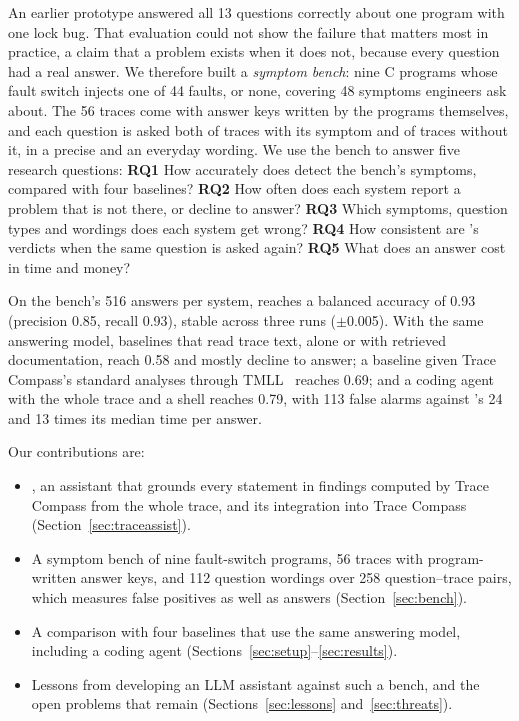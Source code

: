 An earlier prototype answered all 13 questions correctly about one program with one lock bug. That evaluation could not show the failure that matters most in practice, a claim that a problem exists when it does not, because every question had a real answer. We therefore built a \emph{symptom bench}: nine C programs whose fault switch injects one of 44 faults, or none, covering 48 symptoms engineers ask about. The 56 traces come with answer keys written by the programs themselves, and each question is asked both of traces with its symptom and of traces without it, in a precise and an everyday wording. We use the bench to answer five research questions:
\textbf{RQ1} How accurately does \sysname detect the bench's symptoms, compared with four baselines?
\textbf{RQ2} How often does each system report a problem that is not there, or decline to answer?
\textbf{RQ3} Which symptoms, question types and wordings does each system get wrong?
\textbf{RQ4} How consistent are \sysname's verdicts when the same question is asked again?
\textbf{RQ5} What does an answer cost in time and money?

On the bench's 516 answers per system, \sysname reaches a balanced accuracy of 0.93 (precision 0.85, recall 0.93), stable across three runs ($\pm$0.005). With the same answering model, baselines that read trace text, alone or with retrieved documentation, reach 0.58 and mostly decline to answer; a baseline given Trace Compass's standard analyses through TMLL~\cite{shahedi2025tmll} reaches 0.69; and a coding agent with the whole trace and a shell reaches 0.79, with 113 false alarms against \sysname's 24 and 13 times its median time per answer.

Our contributions are:
\begin{itemize}
  \item \sysname, an assistant that grounds every statement in findings computed by Trace Compass from the whole trace, and its integration into Trace Compass (Section~\ref{sec:traceassist}).
  \item A symptom bench of nine fault-switch programs, 56 traces with program-written answer keys, and 112 question wordings over 258 question--trace pairs, which measures false positives as well as answers (Section~\ref{sec:bench}).
  \item A comparison with four baselines that use the same answering model, including a coding agent (Sections~\ref{sec:setup}--\ref{sec:results}).
  \item Lessons from developing an LLM assistant against such a bench, and the open problems that remain (Sections~\ref{sec:lessons} and~\ref{sec:threats}).
\end{itemize}
